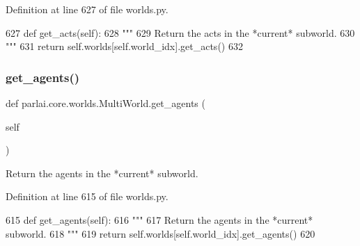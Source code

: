 Definition at line 627 of file worlds.\+py.


\begin{DoxyCode}
627     \textcolor{keyword}{def }get\_acts(self):
628         \textcolor{stringliteral}{"""}
629 \textcolor{stringliteral}{        Return the acts in the *current* subworld.}
630 \textcolor{stringliteral}{        """}
631         \textcolor{keywordflow}{return} self.worlds[self.world\_idx].get\_acts()
632 
\end{DoxyCode}
\mbox{\label{classparlai_1_1core_1_1worlds_1_1MultiWorld_a6e012b3db760d95f189baf3466fc55d0}} 
\subsubsection{\texorpdfstring{get\+\_\+agents()}{get\_agents()}}
{\footnotesize\ttfamily def parlai.\+core.\+worlds.\+Multi\+World.\+get\+\_\+agents (\begin{DoxyParamCaption}\item[{}]{self }\end{DoxyParamCaption})}

\begin{DoxyVerb}Return the agents in the *current* subworld.
\end{DoxyVerb}
 

Definition at line 615 of file worlds.\+py.


\begin{DoxyCode}
615     \textcolor{keyword}{def }get\_agents(self):
616         \textcolor{stringliteral}{"""}
617 \textcolor{stringliteral}{        Return the agents in the *current* subworld.}
618 \textcolor{stringliteral}{        """}
619         \textcolor{keywordflow}{return} self.worlds[self.world\_idx].get\_agents()
620 
\end{DoxyCode}
\mbox{\label{classparlai_1_1core_1_1worlds_1_1MultiWorld_a593c1eb833633014c2506abd80695317}} 
